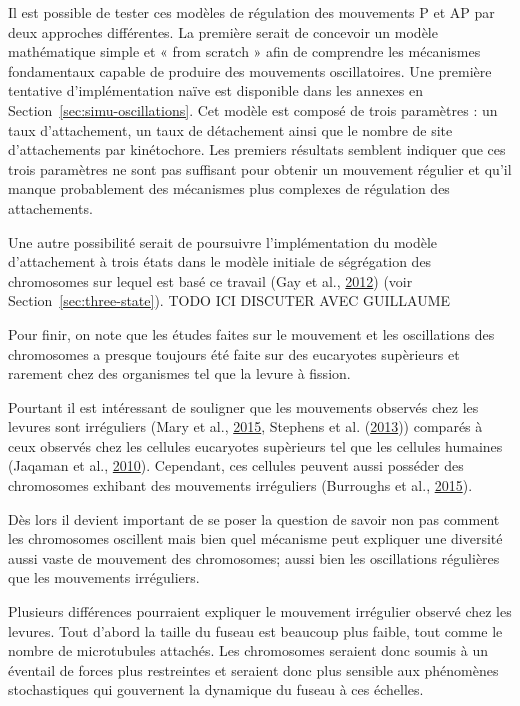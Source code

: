 \documentclass[12pt,a4paper,twoside,openright]{book}
\begin{document}
Il est possible de tester ces modèles de régulation des mouvements P et
AP par deux approches différentes. La première serait de concevoir un
modèle mathématique simple et « from scratch » afin de comprendre les
mécanismes fondamentaux capable de produire des mouvements
oscillatoires. Une première tentative d'implémentation naïve est
disponible dans les annexes en Section~\ref{sec:simu-oscillations}. Cet
modèle est composé de trois paramètres : un taux d'attachement, un taux
de détachement ainsi que le nombre de site d'attachements par
kinétochore. Les premiers résultats semblent indiquer que ces trois
paramètres ne sont pas suffisant pour obtenir un mouvement régulier et
qu'il manque probablement des mécanismes plus complexes de régulation
des attachements.

Une autre possibilité serait de poursuivre l'implémentation du modèle
d'attachement à trois états dans le modèle initiale de ségrégation des
chromosomes sur lequel est basé ce travail (Gay et al.,
\hyperref[ref-Gay2012a]{2012}) (voir Section~\ref{sec:three-state}).
TODO ICI DISCUTER AVEC GUILLAUME

Pour finir, on note que les études faites sur le mouvement et les
oscillations des chromosomes a presque toujours été faite sur des
eucaryotes supèrieurs et rarement chez des organismes tel que la levure
à fission.

Pourtant il est intéressant de souligner que les mouvements observés
chez les levures sont irréguliers (Mary et al.,
\hyperref[ref-Mary2015]{2015}, Stephens et al.
(\hyperref[ref-Stephens2013a]{2013})) comparés à ceux observés chez les
cellules eucaryotes supèrieurs tel que les cellules humaines (Jaqaman et
al., \hyperref[ref-Jaqaman2010]{2010}). Cependant, ces cellules peuvent
aussi posséder des chromosomes exhibant des mouvements irréguliers
(Burroughs et al., \hyperref[ref-Burroughs2015]{2015}).

Dès lors il devient important de se poser la question de savoir non pas
comment les chromosomes oscillent mais bien quel mécanisme peut
expliquer une diversité aussi vaste de mouvement des chromosomes; aussi
bien les oscillations régulières que les mouvements irréguliers.

Plusieurs différences pourraient expliquer le mouvement irrégulier
observé chez les levures. Tout d'abord la taille du fuseau est beaucoup
plus faible, tout comme le nombre de microtubules attachés. Les
chromosomes seraient donc soumis à un éventail de forces plus
restreintes et seraient donc plus sensible aux phénomènes stochastiques
qui gouvernent la dynamique du fuseau à ces échelles.
\end{document}
